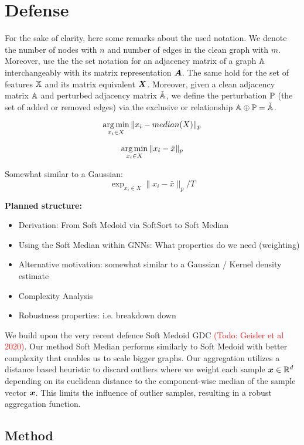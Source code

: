 \documentclass{article} %
\newcommand{\todo}[1]{\textcolor{red}{(Todo: #1)}}
\begin{document}
\section{Defense}

For the sake of clarity, here some remarks about the used notation. We denote the number of nodes with \(n\) and number of edges in the clean graph with \(m\). Moreover, use the the set notation for an adjacency matrix of a graph \({\mathbb{A}}\) interchangeably with its matrix representation \({\bm{A}}\). The same hold for the set of features \({\mathbb{X}}\) and its matrix equivalent \({\bm{X}}\). Moreover, given a clean adjacency matrix \({\mathbb{A}}\) and perturbed adjacency matrix \(\tilde{{\mathbb{A}}}\), we define the perturbation \({\mathbb{P}}\) (the set of added or removed edges) via the exclusive or relationship \({\mathbb{A}} \oplus {\mathbb{P}} = \tilde{{\mathbb{A}}}\).


\[
\operatorname*{arg\,min}_{x_i \in X} \| x_i - median(X) \|_p
\]

\[
\operatorname*{arg\,min}_{x_i \in X} \| x_i - \bar{x} \|_p
\]

Somewhat similar to a Gaussian:
\[
\exp_{x_i \in X} \| x_i - \bar{x} \|_p / T
\]

\textbf{Planned structure:}
\begin{itemize}
   \item Derivation: From Soft Medoid via SoftSort to Soft Median
   \item Using the Soft Median within GNNs: What properties do we need (weighting)
   \item Alternative motivation: somewhat similar to a Gaussian / Kernel density estimate
   \item Complexity Analysis
   \item Robustness properties: i.e. breakdown down %
\end{itemize}


We build upon the very recent defence Soft Medoid GDC \todo{Geisler et al 2020}. Our method Soft Median performs similarly to Soft Medoid with better complexity that enables us to scale bigger graphs. Our aggregation utilizes a distance based heuristic to discard outliers where we weight each sample ${\bm{x}} \in \mathbb{R}^d$ depending on its euclidean distance to the component-wise median of the sample vector ${\bm{x}}$. This limits the influence of outlier samples, resulting in a robust aggregation function.

\subsection{Method} %
\end{document}
